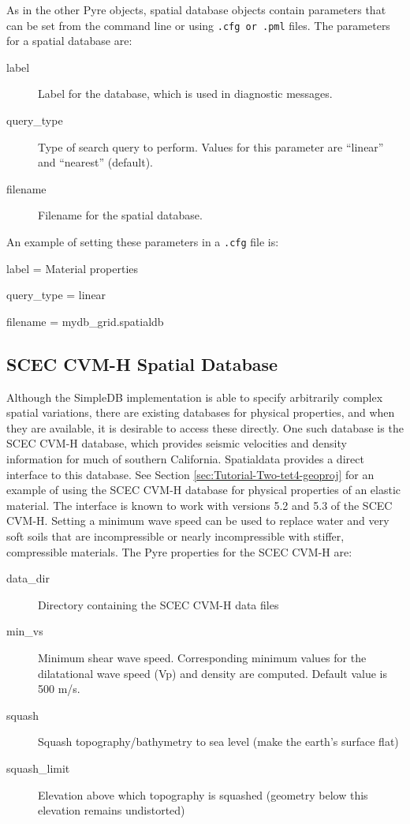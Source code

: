 As in the other Pyre objects, spatial database objects contain parameters
that can be set from the command line or using \texttt{.cfg or .pml}
files. The parameters for a spatial database are:
\begin{description}
\item [{label}] Label for the database, which is used in diagnostic messages.
\item [{query\_type}] Type of search query to perform. Values for this
parameter are ``linear'' and ``nearest'' (default).
\item [{filename}] Filename for the spatial database.
\end{description}
An example of setting these parameters in a \texttt{.cfg} file is:
\begin{lyxcode}
label = Material properties

query\_type = linear

filename = mydb\_grid.spatialdb


\end{lyxcode}

\subsection{\label{sub:SCECCVMH-Impl}SCEC CVM-H Spatial Database}

Although the SimpleDB implementation is able to specify arbitrarily
complex spatial variations, there are existing databases for physical
properties, and when they are available, it is desirable to access
these directly. One such database is the SCEC CVM-H database, which
provides seismic velocities and density information for much of southern
California. Spatialdata provides a direct interface to this database.
See Section \vref{sec:Tutorial-Two-tet4-geoproj} for an example of
using the SCEC CVM-H database for physical properties of an elastic
material. The interface is known to work with versions 5.2 and 5.3
of the SCEC CVM-H. Setting a minimum wave speed can be used to replace
water and very soft soils that are incompressible or nearly incompressible
with stiffer, compressible materials. The Pyre properties for the
SCEC CVM-H are:
\begin{description}
\item [{data\_dir}] Directory containing the SCEC CVM-H data files
\item [{min\_vs}] Minimum shear wave speed. Corresponding minimum values
for the dilatational wave speed (Vp) and density are computed. Default
value is 500 m/s.
\item [{squash}] Squash topography/bathymetry to sea level (make the earth's
surface flat)
\item [{squash\_limit}] Elevation above which topography is squashed (geometry
below this elevation remains undistorted)
\end{description}

